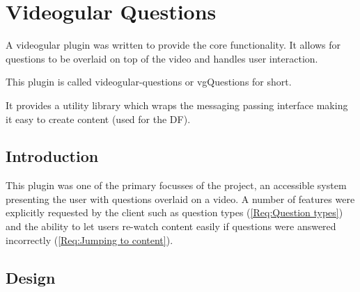 
\chapter{Videogular Questions} \label{Chapter:VideogularQuestions}

\begin{preamble}
A videogular plugin was written to provide the core functionality. It allows for questions to be overlaid on top of the video and handles user interaction.

This plugin is called videogular-questions or \gls{vgQuestions} for short.

It provides a utility library which wraps the messaging passing interface making it easy to create content (used for the \gls{DF}).

\end{preamble}

\section{Introduction}

This plugin was one of the primary focusses of the project, an accessible system presenting the user with questions overlaid on a video. A number of features were explicitly requested by the client such as question types (\cref{Req:Question types}) and the ability to let users re-watch content easily if questions were answered incorrectly (\cref{Req:Jumping to content}).

\section{Design}

